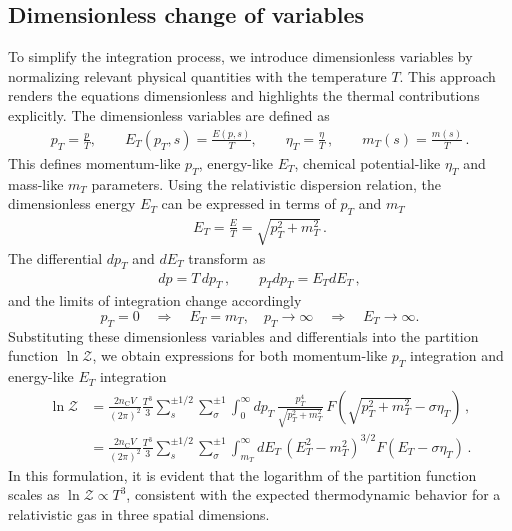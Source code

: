 \documentclass[epjST]{svjour}
\begin{document}
\subsection{Dimensionless change of variables}
\label{sec:dimensionless}
To simplify the integration process, we introduce dimensionless variables by normalizing relevant physical quantities with the temperature \( T \). This approach renders the equations dimensionless and highlights the thermal contributions explicitly. The dimensionless variables are defined as
\begin{align}
    \label{eq:dimensionless_variables}
    p_{T} = \frac{p}{T}, \qquad E_{T}(p_{T},s) = \frac{E(p,s)}{T}, \qquad \eta_{T} = \frac{\eta}{T}\,, \qquad m_{T}(s) = \frac{m(s)}{T}\,.
\end{align}
This defines momentum-like \(p_{T}\), energy-like \(E_{T}\), chemical potential-like \(\eta_{T}\) and mass-like \(m_{T}\) parameters. Using the relativistic dispersion relation, the dimensionless energy \( E_{T} \) can be expressed in terms of \( p_{T} \) and \( m_{T} \)
\begin{align}
    E_{T} = \frac{E}{T} = \sqrt{p_{T}^{2} + m_{T}^{2}}\,.
\end{align}
The differential \( dp_{T} \) and \( dE_{T} \) transform as
\begin{align}
    dp = T \, dp_{T}\,,\qquad p_{T}dp_{T} = E_{T} dE_{T}\,,
\end{align}
and the limits of integration change accordingly
\begin{equation}
    p_{T} = 0 \quad \Rightarrow \quad E_{T} = m_{T}, \quad p_{T} \to \infty \quad \Rightarrow \quad E_{T} \to \infty.
\end{equation}
Substituting these dimensionless variables and differentials into the partition function \( \ln\mathcal{Z} \), we obtain expressions for both momentum-like \(p_{T}\) integration and energy-like \(E_{T}\) integration
\begin{align}
    \label{eq:dimensionless_partition}
    \ln\mathcal{Z} 
    &= \frac{2 n_\mathrm{C} V}{(2\pi)^{2}} \frac{T^{3}}{3} \sum_{s}^{\pm1/2}\sum_{\sigma}^{\pm1} \int_{0}^{\infty} dp_{T} \, \frac{p_{T}^{4}}{\sqrt{p_{T}^{2} + m_{T}^{2}}} \, F\left(\sqrt{p_{T}^{2} + m_{T}^{2}} - \sigma\eta_{T}\right)\,,\\
    \label{eq:dimensionless_partition2}
    &= \frac{2 n_\mathrm{C} V}{(2\pi)^{2}} \frac{T^{3}}{3} \sum_{s}^{\pm1/2}\sum_{\sigma}^{\pm1} \int_{m_{T}}^{\infty} dE_{T} \, (E_{T}^2-m_{T}^2)^{3/2} F\left(E_{T} - \sigma\eta_{T}\right)\,.
\end{align}
In this formulation, it is evident that the logarithm of the partition function scales as \( \ln\mathcal{Z} \propto T^{3} \), consistent with the expected thermodynamic behavior for a relativistic gas in three spatial dimensions.
\end{document}
